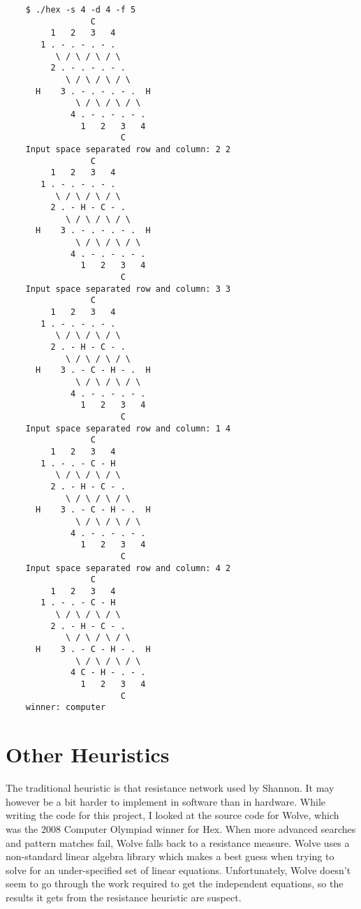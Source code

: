 \documentclass[12pt,titlepage]{amsart}
\begin{document}
\singlespacing
\begin{verbatim}
    $ ./hex -s 4 -d 4 -f 5
                 C
         1   2   3   4
       1 . - . - . - .
          \ / \ / \ / \
         2 . - . - . - .
            \ / \ / \ / \
      H    3 . - . - . - .  H
              \ / \ / \ / \
             4 . - . - . - .
               1   2   3   4
                       C
    Input space separated row and column: 2 2
                 C
         1   2   3   4
       1 . - . - . - .
          \ / \ / \ / \
         2 . - H - C - .
            \ / \ / \ / \
      H    3 . - . - . - .  H
              \ / \ / \ / \
             4 . - . - . - .
               1   2   3   4
                       C
    Input space separated row and column: 3 3
                 C
         1   2   3   4
       1 . - . - . - .
          \ / \ / \ / \
         2 . - H - C - .
            \ / \ / \ / \
      H    3 . - C - H - .  H
              \ / \ / \ / \
             4 . - . - . - .
               1   2   3   4
                       C
    Input space separated row and column: 1 4
                 C
         1   2   3   4
       1 . - . - C - H
          \ / \ / \ / \
         2 . - H - C - .
            \ / \ / \ / \
      H    3 . - C - H - .  H
              \ / \ / \ / \
             4 . - . - . - .
               1   2   3   4
                       C
    Input space separated row and column: 4 2
                 C
         1   2   3   4
       1 . - . - C - H
          \ / \ / \ / \
         2 . - H - C - .
            \ / \ / \ / \
      H    3 . - C - H - .  H
              \ / \ / \ / \
             4 C - H - . - .
               1   2   3   4
                       C
    winner: computer
\end{verbatim}
\doublespacing

\section{Other Heuristics}

The traditional heuristic is that resistance network used by Shannon. It may
however  be a bit harder to implement in software than in hardware. While
writing the code for this project, I looked at the source code for Wolve, which
was the 2008 Computer Olympiad winner for Hex. When more advanced searches and
pattern matches fail, Wolve falls back to a resistance measure. Wolve uses a
non-standard linear algebra library which makes a best guess when trying to
solve for an under-specified set of linear equations.  Unfortunately, Wolve
doesn't seem to go through the work required to get the independent equations,
so the results it gets from the resistance heuristic are suspect.
\end{document}

